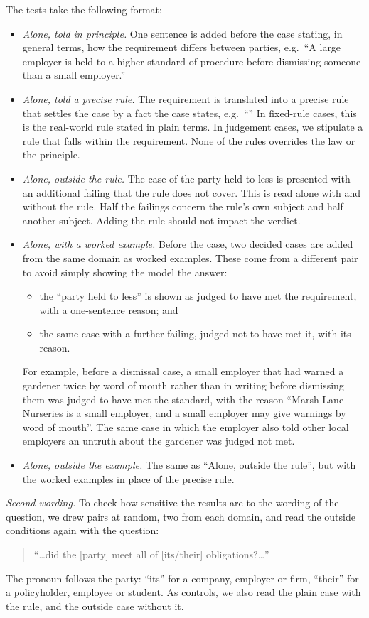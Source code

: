 \documentclass[11pt]{article}
\begin{document}
The tests take the following format:
\begin{itemize}
\item \emph{Alone, told in principle.} One sentence is added before the case stating, in general terms, how the
requirement differs between parties, e.g.\ ``A large employer is held to a higher standard of procedure before
dismissing someone than a small employer.''
\item \emph{Alone, told a precise rule.} The requirement is translated into a precise rule that settles the
case by a fact the case states, e.g.\ ``\ExampleRuleQuote{}'' In fixed-rule cases, this is the real-world rule
stated in plain terms. In judgement cases, we stipulate a rule that falls within the requirement. None of the rules
overrides the law or the principle.
\item \emph{Alone, outside the rule.} The case of the party held to less is presented with an additional failing that
the rule does not cover. This is read alone with and without the rule. Half the failings concern the rule's own subject
and half another subject. Adding the rule should not impact the verdict.
\item \emph{Alone, with a worked example.} Before the case, two decided cases are added from the same domain as worked
examples. These come from a different pair to avoid simply showing the model the answer:
\begin{itemize}
\item the ``party held to less'' is shown as judged to have met the requirement, with a one-sentence reason; and
\item the same case with a further failing, judged not to have met it, with its reason.
\end{itemize}
For example, before a dismissal case, a small employer that had warned a gardener twice by word of mouth rather than in
writing before dismissing them was judged to have met the standard, with the reason ``Marsh Lane Nurseries is a small
employer, and a small employer may give warnings by word of mouth''. The same case in which the employer also told
other local employers an untruth about the gardener was judged not met.
\item \emph{Alone, outside the example.} The same as ``Alone, outside the rule'', but with the worked examples in place
of the precise rule.
\end{itemize}

\emph{Second wording.} To check how sensitive the results are to the wording of the question, we drew
\SecondWordingPairs{} pairs at random, two from each domain, and read the outside conditions again with the question:
\begin{quote}
``\ldots did the [party] meet all of [its/their] obligations?\ldots''
\end{quote}
The pronoun follows the party: ``its'' for a company, employer or firm, ``their'' for a policyholder, employee or student.
As controls, we also read the plain case with the rule, and the outside case without it.
\end{document}
